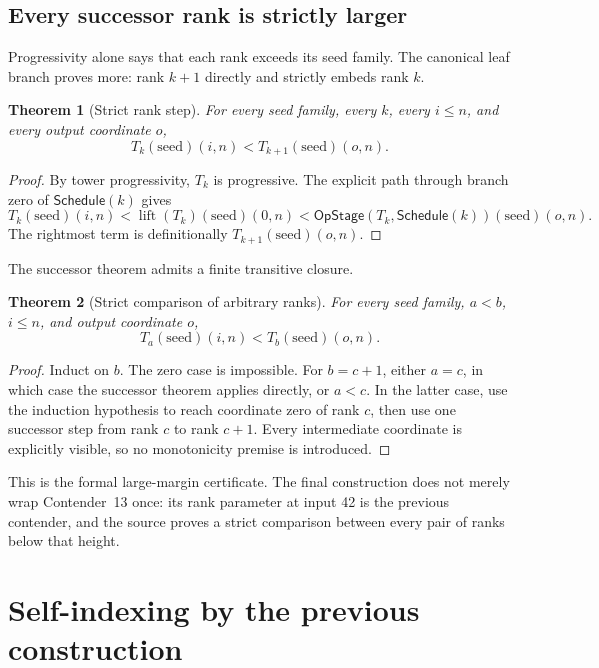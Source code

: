 \documentclass[11pt]{article}
\newtheorem{theorem}{Theorem}[section]
\theoremstyle{definition}
\theoremstyle{remark}
\newcommand{\opstage}{\mathsf{OpStage}}
\newcommand{\sched}{\mathsf{Schedule}}
\begin{document}
\subsection{Every successor rank is strictly larger}

Progressivity alone says that each rank exceeds its seed family.  The canonical
leaf branch proves more: rank $k+1$ directly and strictly embeds rank $k$.

\begin{theorem}[Strict rank step]
For every seed family, every $k$, every $i\le n$, and every output coordinate
$o$,
\[
T_k(\mathrm{seed})(i,n)<T_{k+1}(\mathrm{seed})(o,n).
\]
\end{theorem}

\begin{proof}
By tower progressivity, $T_k$ is progressive.  The explicit path through
branch zero of $\sched(k)$ gives
\[
T_k(\mathrm{seed})(i,n)
 < \operatorname{lift}(T_k)(\mathrm{seed})(0,n)
 < \opstage(T_k,\sched(k))(\mathrm{seed})(o,n).
\]
The rightmost term is definitionally $T_{k+1}(\mathrm{seed})(o,n)$.
\end{proof}

The successor theorem admits a finite transitive closure.

\begin{theorem}[Strict comparison of arbitrary ranks]
For every seed family, $a<b$, $i\le n$, and output coordinate $o$,
\[
T_a(\mathrm{seed})(i,n)<T_b(\mathrm{seed})(o,n).
\]
\end{theorem}

\begin{proof}
Induct on $b$.  The zero case is impossible.  For $b=c+1$, either $a=c$, in
which case the successor theorem applies directly, or $a<c$.  In the latter
case, use the induction hypothesis to reach coordinate zero of rank $c$, then
use one successor step from rank $c$ to rank $c+1$.  Every intermediate
coordinate is explicitly visible, so no monotonicity premise is introduced.
\end{proof}

This is the formal large-margin certificate.  The final construction does not
merely wrap Contender~13 once: its rank parameter at input 42 is the previous
contender, and the source proves a strict comparison between every pair of
ranks below that height.

\section{Self-indexing by the previous construction}
\end{document}
